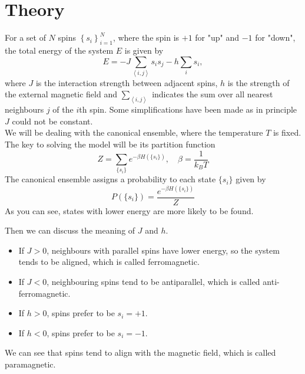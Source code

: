 \documentclass[11pt]{article}
\begin{document}
	\section{Theory}
	
	For a set of $N$ spins $\left\{s_i\right\}_{i=1}^N$, where the spin is $+1$ for "up" and $-1$ for "down", the total energy of the system $E$ is given by\cite{Baierlein_1999}
	\begin{equation}
		E = -J\sum_{\left<i,j\right>}s_is_j - h\sum_i s_i,
	\end{equation}
	where $J$ is the interaction strength between adjacent spins, $h$ is the strength of the external magnetic field and $\sum_{\left<i,j\right>}$ indicates the sum over all nearest neighbours $j$ of the $i$th spin. Some simplifications have been made as in principle $J$ could not be constant. \\
	
	We will be dealing with the canonical ensemble, where the temperature $T$ is fixed. The key to solving the model will be its partition function
	\begin{equation} \label{eq:PartitionFunction}
		Z = \sum_{\{s_i\}} e^{-\beta H(\{s_i\})}, \quad \beta = \frac{1}{k_B T}
	\end{equation}
	The canonical ensemble assigns a probability to each state $\{s_i\}$ given by
	\begin{equation} \label{eq:Probability}
		P(\{s_i\}) = \frac{e^{-\beta H(\{s_i\})}}{Z}
	\end{equation}
	As you can see, states with lower energy are more likely to be found.

	Then we can discuss the meaning of $J$ and $h$.
	\begin{itemize}
		\item If $J > 0$, neighbours with parallel spins have lower energy, so the system tends to be aligned, which is called ferromagnetic.
		\item If $J < 0$, neighbouring spins tend to be antiparallel, which is called anti-ferromagnetic.
	\end{itemize}
	\begin{itemize}
		\item If $h > 0$, spins prefer to be $s_i = +1$.
		\item If $h < 0$, spins prefer to be $s_i = -1$.
	\end{itemize}
	We can see that spins tend to align with the magnetic field, which is called paramagnetic.

\end{document}
